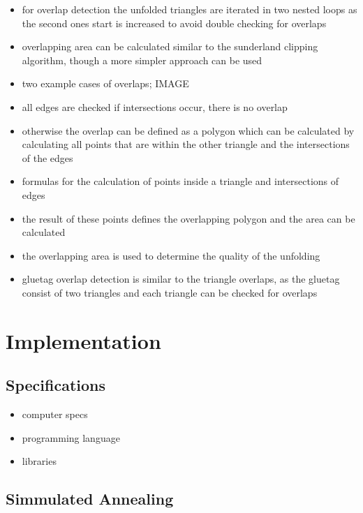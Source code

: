 \documentclass[draft,final]{vutinfth} %
\begin{document}
\begin{itemize}
	\item for overlap detection the unfolded triangles are iterated in two nested loops as the second ones start is increased to avoid double checking for overlaps
	\item overlapping area can be calculated similar to the sunderland clipping algorithm, though a more simpler approach can be used
	\item two example cases of overlaps; IMAGE
	\item all edges are checked if intersections occur, there is no overlap
	\item otherwise the overlap can be defined as a polygon which can be calculated by calculating all points that are within the other triangle and the intersections of the edges
	\item formulas for the calculation of points inside a triangle and intersections of edges
	\item the result of these points defines the overlapping polygon and the area can be calculated
	\item the overlapping area is used to determine the quality of the unfolding
	\item gluetag overlap detection is similar to the triangle overlaps, as the gluetag consist of two triangles and each triangle can be checked for overlaps
\end{itemize}

\chapter{Implementation}
\label{chap:Implementation}

\section{Specifications}

\begin{itemize}
	\item computer specs
	\item programming language
	\item libraries
\end{itemize}

\section{Simmulated Annealing}
\end{document}
